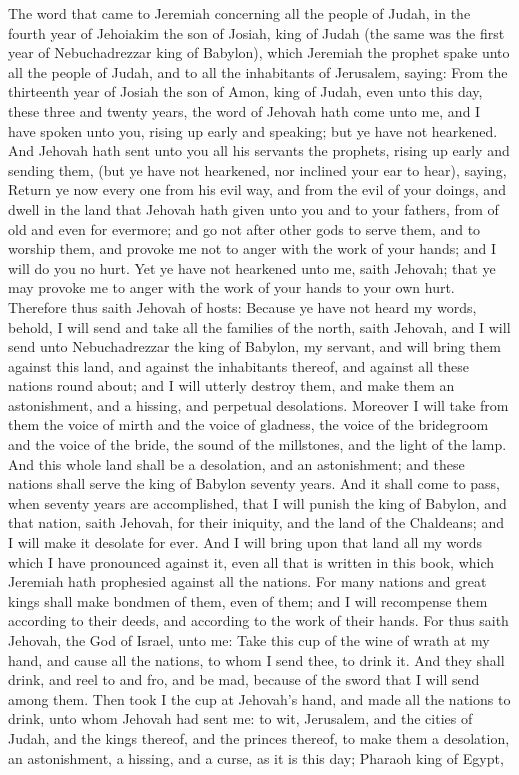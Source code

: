 The word that came to Jeremiah concerning all the people of Judah, in the fourth year of Jehoiakim the son of Josiah, king of Judah (the same was the first year of Nebuchadrezzar king of Babylon), which Jeremiah the prophet spake unto all the people of Judah, and to all the inhabitants of Jerusalem, saying: From the thirteenth year of Josiah the son of Amon, king of Judah, even unto this day, these three and twenty years, the word of Jehovah hath come unto me, and I have spoken unto you, rising up early and speaking; but ye have not hearkened. And Jehovah hath sent unto you all his servants the prophets, rising up early and sending them, (but ye have not hearkened, nor inclined your ear to hear), saying, Return ye now every one from his evil way, and from the evil of your doings, and dwell in the land that Jehovah hath given unto you and to your fathers, from of old and even for evermore; and go not after other gods to serve them, and to worship them, and provoke me not to anger with the work of your hands; and I will do you no hurt. Yet ye have not hearkened unto me, saith Jehovah; that ye may provoke me to anger with the work of your hands to your own hurt. Therefore thus saith Jehovah of hosts: Because ye have not heard my words, behold, I will send and take all the families of the north, saith Jehovah, and I will send unto Nebuchadrezzar the king of Babylon, my servant, and will bring them against this land, and against the inhabitants thereof, and against all these nations round about; and I will utterly destroy them, and make them an astonishment, and a hissing, and perpetual desolations. Moreover I will take from them the voice of mirth and the voice of gladness, the voice of the bridegroom and the voice of the bride, the sound of the millstones, and the light of the lamp. And this whole land shall be a desolation, and an astonishment; and these nations shall serve the king of Babylon seventy years.  And it shall come to pass, when seventy years are accomplished, that I will punish the king of Babylon, and that nation, saith Jehovah, for their iniquity, and the land of the Chaldeans; and I will make it desolate for ever. And I will bring upon that land all my words which I have pronounced against it, even all that is written in this book, which Jeremiah hath prophesied against all the nations. For many nations and great kings shall make bondmen of them, even of them; and I will recompense them according to their deeds, and according to the work of their hands.  For thus saith Jehovah, the God of Israel, unto me: Take this cup of the wine of wrath at my hand, and cause all the nations, to whom I send thee, to drink it. And they shall drink, and reel to and fro, and be mad, because of the sword that I will send among them. Then took I the cup at Jehovah’s hand, and made all the nations to drink, unto whom Jehovah had sent me: to wit, Jerusalem, and the cities of Judah, and the kings thereof, and the princes thereof, to make them a desolation, an astonishment, a hissing, and a curse, as it is this day; Pharaoh king of Egypt, 